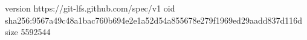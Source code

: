 version https://git-lfs.github.com/spec/v1
oid sha256:9567a49c48a1bac760b694e2e1a52d54a855678e279f1969ed29aadd837d116d
size 5592544
